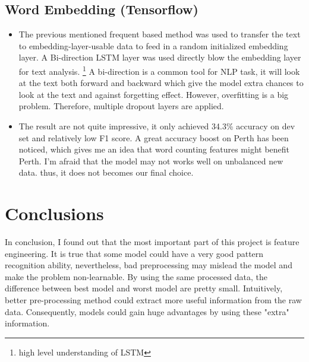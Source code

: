 \documentclass[11pt]{article}
\begin{document}
\subsection{Word Embedding (Tensorflow)}
\begin{itemize}
      \item The previous mentioned frequent based method was used to transfer the text 
            to embedding-layer-usable data to feed in a 
            random initialized embedding layer. A Bi-direction LSTM layer was used directly blow the embedding layer for text analysis.
            \footnote{high level understanding of LSTM }
            A bi-direction is a common tool for NLP task, it will look at the text both forward and 
            backward which give the model extra chances to look at the text and against forgetting effect.
            However, overfitting is a big problem. Therefore, multiple dropout layers are applied.
      \item The result are not quite impressive, it only achieved 34.3\% accuracy on dev set and relatively low
            F1 score. A great accuracy boost on Perth has been noticed, which gives me an idea that word
            counting features might benefit Perth. I'm afraid that the model may not works well on unbalanced new data.
            thus, it does not becomes our final choice.
\end{itemize}

\section{Conclusions}

In conclusion, I found out that the most important part of this project is feature engineering.
It is true that some model could have a very good pattern recognition ability, nevertheless,
bad preprocessing may mislead the model and make the problem non-learnable.
By using the same processed data, the difference between best model and worst model are pretty small. 
Intuitively, better pre-processing method could extract 
more useful information from the raw data. Consequently, models could gain huge advantages by 
using these "extra" information.



\end{document}
